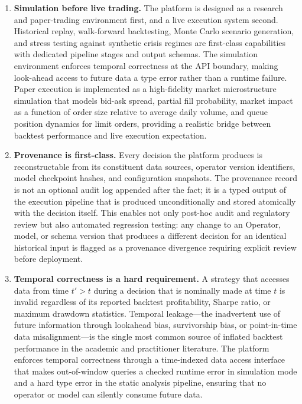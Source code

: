 \documentclass[12pt,openany]{book}
\numberwithin{equation}{chapter}
\theoremstyle{plain}
\theoremstyle{definition}
\theoremstyle{remark}
\begin{document}
\begin{enumerate}
    \item \textbf{Simulation before live trading.} The platform is designed
          as a research and paper-trading environment first, and a live
          execution system second. Historical replay, walk-forward
          backtesting, Monte Carlo scenario generation, and stress testing
          against synthetic crisis regimes are first-class capabilities with
          dedicated pipeline stages and output schemas. The simulation
          environment enforces temporal correctness at the API boundary,
          making look-ahead access to future data a type error rather than a
          runtime failure. Paper execution is implemented as a high-fidelity
          market microstructure simulation that models bid-ask spread,
          partial fill probability, market impact as a function of order
          size relative to average daily volume, and queue position dynamics
          for limit orders, providing a realistic bridge between backtest
          performance and live execution expectation.

    \item \textbf{Provenance is first-class.} Every decision the platform
          produces is reconstructable from its constituent data sources,
          operator version identifiers, model checkpoint hashes, and
          configuration snapshots. The provenance record is not an optional
          audit log appended after the fact; it is a typed output of the
          execution pipeline that is produced unconditionally and stored
          atomically with the decision itself. This enables not only
          post-hoc audit and regulatory review but also automated regression
          testing: any change to an Operator, model, or schema version that
          produces a different decision for an identical historical input is
          flagged as a provenance divergence requiring explicit review before
          deployment.

    \item \textbf{Temporal correctness is a hard requirement.} A strategy
          that accesses data from time $t' > t$ during a decision that is
          nominally made at time $t$ is invalid regardless of its reported
          backtest profitability, Sharpe ratio, or maximum drawdown
          statistics. Temporal leakage---the inadvertent use of future
          information through lookahead bias, survivorship bias, or
          point-in-time data misalignment---is the single most common source
          of inflated backtest performance in the academic and practitioner
          literature. The platform enforces temporal correctness through a
          time-indexed data access interface that makes out-of-window queries
          a checked runtime error in simulation mode and a hard type error in
          the static analysis pipeline, ensuring that no operator or model
          can silently consume future data.


\end{enumerate}
\end{document}
